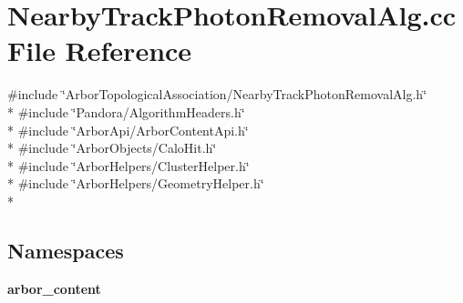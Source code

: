 \section{Nearby\+Track\+Photon\+Removal\+Alg.\+cc File Reference}
\label{NearbyTrackPhotonRemovalAlg_8cc}
{\ttfamily \#include \char`\"{}Arbor\+Topological\+Association/\+Nearby\+Track\+Photon\+Removal\+Alg.\+h\char`\"{}}\\*
{\ttfamily \#include \char`\"{}Pandora/\+Algorithm\+Headers.\+h\char`\"{}}\\*
{\ttfamily \#include \char`\"{}Arbor\+Api/\+Arbor\+Content\+Api.\+h\char`\"{}}\\*
{\ttfamily \#include \char`\"{}Arbor\+Objects/\+Calo\+Hit.\+h\char`\"{}}\\*
{\ttfamily \#include \char`\"{}Arbor\+Helpers/\+Cluster\+Helper.\+h\char`\"{}}\\*
{\ttfamily \#include \char`\"{}Arbor\+Helpers/\+Geometry\+Helper.\+h\char`\"{}}\\*
\subsection*{Namespaces}
\begin{DoxyCompactItemize}
\item 
 {\bf arbor\+\_\+content}
\end{DoxyCompactItemize}
